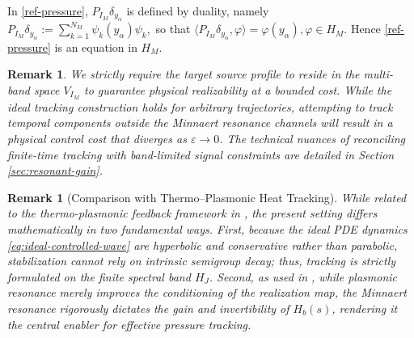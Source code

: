 \documentclass[11pt,a4paper]{article}
\numberwithin{equation}{section}
\newtheorem{remark}[theorem]{Remark}
\begin{document}
\noindent In \eqref{ref-pressure}, \(P_{I_M}\delta_{y_\alpha}\) is defined by duality, namely $
P_{I_M}\delta_{y_\alpha}
:=
\sum_{k=1}^{N_M}\psi_k(y_\alpha)\psi_k ,
$
so that
$
\big\langle P_{I_M}\delta_{y_\alpha},\varphi\big\rangle
=
\varphi(y_\alpha), \varphi\in H_M .
$
Hence \eqref{ref-pressure} is an equation in \(H_M\).

\begin{remark}
We strictly require the target source profile to reside in the multi-band space $V_{I_M}$ to guarantee physical realizability at a bounded cost. While the ideal tracking construction holds for arbitrary trajectories, attempting to track temporal components outside the Minnaert resonance channels will result in a physical control cost that diverges as $\varepsilon \to 0$. The technical nuances of reconciling finite-time tracking with band-limited signal constraints are detailed in Section \ref{sec:resonant-gain}.
\end{remark}



 \begin{remark}[Comparison with Thermo--Plasmonic Heat Tracking]

While related to the thermo-plasmonic feedback framework in \cite{RodriguesSiniHeat}, the present setting differs mathematically in two fundamental ways. First, because the ideal PDE dynamics \eqref{eq:ideal-controlled-wave} are hyperbolic and conservative rather than parabolic, stabilization cannot rely on intrinsic semigroup decay; thus, tracking is strictly formulated on the finite spectral band $H_J$. Second, as used in \cite{RodriguesSiniHeat}, while plasmonic resonance merely improves the conditioning of the realization map, the Minnaert resonance rigorously dictates the \emph{gain} and invertibility of $H_b(s)$, rendering it the central enabler for effective pressure tracking.

\end{remark}
\end{document}
